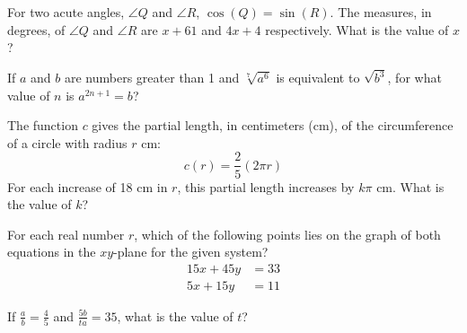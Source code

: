 \noindent\markforreview
\vspace{1em}

For two acute angles, \(\angle Q\) and \(\angle R\), \(\cos(Q) = \sin(R)\).
The measures, in degrees, of \(\angle Q\) and \(\angle R\) are \(x + 61\) and \(4x + 4\) respectively.
What is the value of \(x\)?

\vspace{2em}
\newpage

\noindent\markforreview
\vspace{1em}

If \(a\) and \(b\) are numbers greater than 1 and \(\sqrt[7]{a^6}\) is equivalent to \(\sqrt{b^3}\), for what value of \(n\) is \(a^{2n+1} = b\)?

\vspace{2em}
\newpage

\noindent\markforreview
\vspace{1em}

The function \(c\) gives the partial length, in centimeters (cm), of the circumference of a circle with radius \(r\) cm:
\[
c(r) = \frac{2}{5}(2\pi r)
\]
For each increase of 18 cm in \(r\), this partial length increases by \(k\pi\) cm.
What is the value of \(k\)?

\vspace{2em}
\newpage

\noindent\markforreview
\vspace{1em}

For each real number \(r\), which of the following points lies on the graph of both equations in the \(xy\)-plane for the given system?
\[
\begin{aligned}
15x + 45y &= 33 \\
5x + 15y &= 11
\end{aligned}
\]

\vspace{0.75em}


\vspace{2em}
\newpage

\noindent\markforreview
\vspace{1em}

If \(\frac{a}{b} = \frac{4}{5}\) and \(\frac{5b}{ta} = 35\), what is the value of \(t\)?

